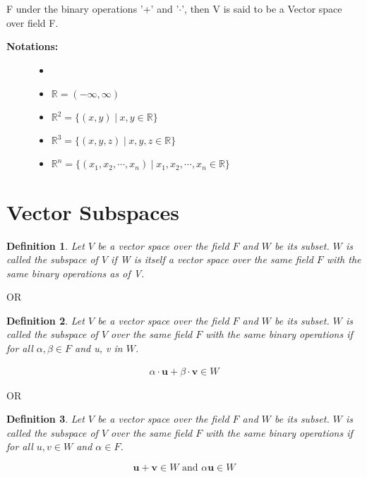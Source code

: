 \documentclass[a4paper, titlepage]{article}
\newtheorem{definition}{Definition}[section]
\begin{document}
F under the binary operations '+' and '$\cdot$', then V is said to
be a Vector space over field F.
\begin{description}
    \item[\textbf{Notations:}] 
        \begin{itemize}
            \item[]
            \item $\mathbb{R} = (-\infty, \infty)$
            \item $\mathbb{R}^2 = \{ (x, y) \hspace{3pt} | \hspace{3pt} x, y \in \mathbb{R} \}$
            \item $\mathbb{R}^3 = \{ (x, y, z) \hspace{3pt} | \hspace{3pt} x, y, z \in \mathbb{R} \}$
            \item $\mathbb{R}^n = \{ (x_1, x_2, \cdots, x_n) \hspace{3pt} | \hspace{3pt} x_1, x_2, \cdots, x_n \in \mathbb{R} \}$
        \end{itemize}
    \item[]  
\end{description}

\section{Vector Subspaces}


\begin{center}
    \date{$7^{\text{th}}$ September 2021}
\end{center}

\begin{definition}
    \label{subspacedef1}
    Let $V$ be a vector space over the field $F$ and $W$ be its subset. 
    $W$ is called the subspace of $V$ if W is itself a vector space 
    over the same field $F$ with the same binary operations as of V.
\end{definition}
\begin{center}
    OR
\end{center}
\begin{definition}
    \label{subspacedef2}
    Let $V$ be a vector space over the field $F$ and $W$ be its subset. 
    $W$ is called the subspace of $V$ over the same field $F$ with the 
    same binary operations if for all $\alpha, \beta \in F$ and u, v
    in $W$.
\end{definition}
\begin{align*}
    \alpha\cdot\bm{u} + \beta\cdot\bm{v} \in W
\end{align*}
\begin{center}
    OR
\end{center}
\begin{definition}
    \label{subspacedef3}
    Let $V$ be a vector space over the field $F$ and $W$ be its subset. 
    $W$ is called the subspace of $V$ over the same field $F$ with the 
    same binary operations if for all $u, v \in W$ and $\alpha \in F$.
\end{definition}
\[ \bm{u} + \bm{v} \in W \text{ and } \alpha \bm{u} \in W \]
\end{document}
